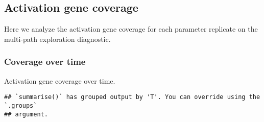 \documentclass[]{book}
\newenvironment{Shaded}{\begin{snugshade}}{\end{snugshade}}
\newcommand{\DataTypeTok}[1]{\textcolor[rgb]{0.13,0.29,0.53}{#1}}
\newcommand{\KeywordTok}[1]{\textcolor[rgb]{0.13,0.29,0.53}{\textbf{#1}}}
\newcommand{\NormalTok}[1]{#1}
\newcommand{\OperatorTok}[1]{\textcolor[rgb]{0.81,0.36,0.00}{\textbf{#1}}}
\newcommand{\StringTok}[1]{\textcolor[rgb]{0.31,0.60,0.02}{#1}}
\begin{document}
\hypertarget{activation-gene-coverage-3}{%
\subsection{Activation gene coverage}\label{activation-gene-coverage-3}}

Here we analyze the activation gene coverage for each parameter replicate on the multi-path exploration diagnostic.

\hypertarget{coverage-over-time-4}{%
\subsubsection{Coverage over time}\label{coverage-over-time-4}}

Activation gene coverage over time.

\begin{Shaded}
\end{Shaded}

\begin{verbatim}
## `summarise()` has grouped output by 'T'. You can override using the `.groups`
## argument.
\end{verbatim}
\end{document}
